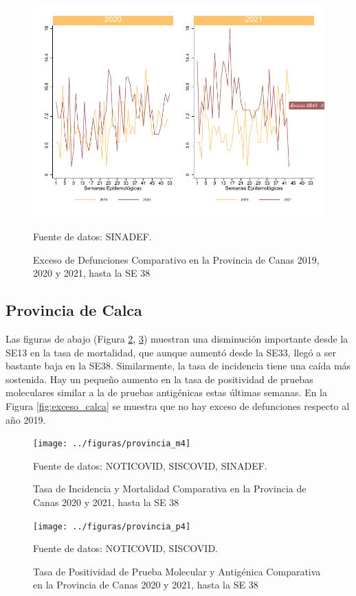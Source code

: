 \documentclass[12pt,a4paper,openany]{book}
\begin{document}
	\begin{figure}[h]
		\caption{Exceso de Defunciones Comparativo en la Provincia de Canas 2019, 2020 y 2021, hasta la SE 38}\label{fig:exceso_canas}
		\begin{center}
			\includegraphics[width=0.7\linewidth]{../figuras/exceso_3}
		\end{center}
		{\footnotesize {Fuente de datos: SINADEF.}}
	\end{figure}

\clearpage

	\subsection*{Provincia de Calca}
	\noindent Las figuras de abajo (Figura \ref{fig:inc_mort_calca}, \ref{fig:positividad_calca})  muestran una disminución importante desde la SE13 en la tasa de mortalidad, que aunque aumentó desde la SE33, llegó a ser bastante baja en la SE38. Similarmente, la tasa de incidencia tiene una caída más sostenida. Hay un pequeño aumento en la tasa de positividad de pruebas moleculares similar a la de pruebas antigénicas estas últimas semanas. En la Figura \ref{fig:exceso_calca} se muestra que no hay exceso de defunciones respecto al año 2019.

	\begin{figure}[h]
	\caption{Tasa de Incidencia y Mortalidad Comparativa en la Provincia de Canas 2020 y 2021, hasta la SE 38}\label{fig:inc_mort_calca}
	\begin{center}
		\texttt{[image: ../figuras/provincia\_m4]}
	\end{center}
	{\footnotesize {Fuente de datos: NOTICOVID, SISCOVID, SINADEF.}}
	\end{figure}

	\begin{figure}[h]
	\caption{Tasa de Positividad de Prueba Molecular y Antigénica Comparativa en la Provincia de Canas 2020 y 2021, hasta la SE 38}\label{fig:positividad_calca}
	\begin{center}
		\texttt{[image: ../figuras/provincia\_p4]}
	\end{center}
	{\footnotesize {Fuente de datos: NOTICOVID, SISCOVID.}}
	\end{figure}
\end{document}
